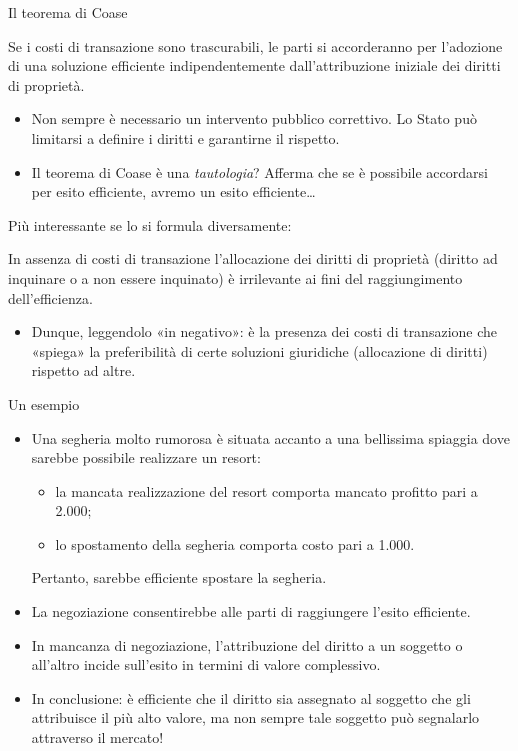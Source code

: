 \documentclass[aspectratio=64,11pt]{beamer}
\begin{document}
\begin{frame}{Il teorema di Coase}
\vspace*{-2mm}
\begin{block}{}
Se i costi di transazione sono trascurabili, le parti si accorderanno per
l'adozione di una soluzione efficiente indipendentemente dall'attribuzione
iniziale dei diritti di proprietà.
\end{block}
\begin{itemize}
\item Non sempre è necessario un intervento pubblico correttivo.  Lo Stato può
limitarsi a definire i diritti e garantirne il rispetto.
\item Il teorema di Coase è una \emph{tautologia}? Afferma che se è possibile
accordarsi per esito efficiente, avremo un esito efficiente\ldots{}
\end{itemize}

Più interessante se lo si formula diversamente:
\vspace{-2mm}
\begin{block}{}
In assenza di costi di transazione l'allocazione dei diritti di proprietà
(diritto ad inquinare o a non essere inquinato) è irrilevante ai fini del
raggiungimento dell'efficienza.
\end{block}
\begin{itemize}
\item Dunque, leggendolo «in negativo»: è la presenza dei costi di transazione
che «spiega» la preferibilità di certe soluzioni giuridiche (allocazione
di diritti) rispetto ad altre.
\end{itemize}
\end{frame}

\begin{frame}{Un esempio}
\begin{itemize}
\item Una segheria molto rumorosa è situata accanto a una bellissima spiaggia dove
sarebbe possibile realizzare un resort:
\begin{itemize}
\item la mancata realizzazione del resort comporta mancato profitto pari a 2.000;
\item lo spostamento della segheria comporta costo pari a 1.000.
\end{itemize}
Pertanto, sarebbe efficiente spostare la segheria.
\item La negoziazione consentirebbe alle parti di raggiungere l'esito efficiente.
\item In mancanza di negoziazione, l'attribuzione del diritto a un soggetto o
  all'altro incide sull'esito in termini di valore complessivo.
\item In conclusione: è efficiente che il diritto sia assegnato al soggetto
  che gli attribuisce il più alto valore, ma non sempre tale soggetto può
  segnalarlo attraverso il mercato!
\end{itemize}
\end{frame}
\end{document}

